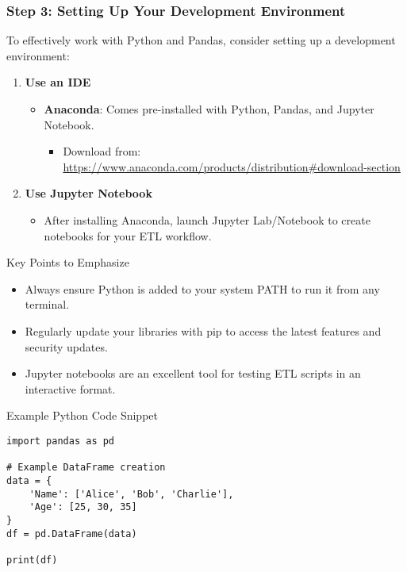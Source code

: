\documentclass[aspectratio=169]{beamer}
\begin{document}
\begin{frame}[fragile]
    \frametitle{Step 3: Setting Up Your Development Environment}
    To effectively work with Python and Pandas, consider setting up a development environment:
    
    \begin{enumerate}
        \item \textbf{Use an IDE}
        \begin{itemize}
            \item \textbf{Anaconda}: Comes pre-installed with Python, Pandas, and Jupyter Notebook.
            \begin{itemize}
                \item Download from: \url{https://www.anaconda.com/products/distribution#download-section}
            \end{itemize}
        \end{itemize}
        
        \item \textbf{Use Jupyter Notebook}
        \begin{itemize}
            \item After installing Anaconda, launch Jupyter Lab/Notebook to create notebooks for your ETL workflow.
        \end{itemize}
    \end{enumerate}
    
    \begin{block}{Key Points to Emphasize}
        \begin{itemize}
            \item Always ensure Python is added to your system PATH to run it from any terminal.
            \item Regularly update your libraries with pip to access the latest features and security updates.
            \item Jupyter notebooks are an excellent tool for testing ETL scripts in an interactive format.
        \end{itemize}
    \end{block}
    
    \begin{block}{Example Python Code Snippet}
        \begin{lstlisting}
import pandas as pd

# Example DataFrame creation
data = {
    'Name': ['Alice', 'Bob', 'Charlie'],
    'Age': [25, 30, 35]
}
df = pd.DataFrame(data)

print(df)
        \end{lstlisting}
    \end{block}
\end{frame}
\end{document}
